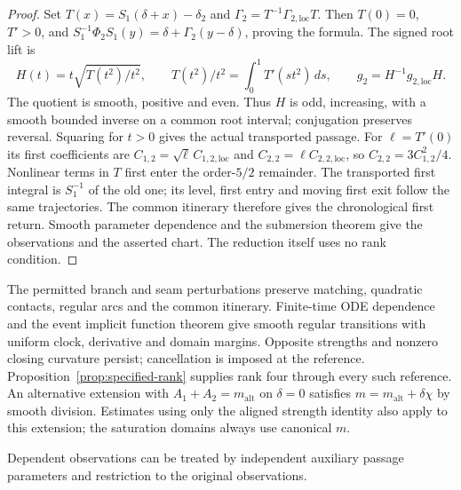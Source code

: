 \begin{proof}
Set $T(x)=S_1(\delta+x)-\delta_2$ and
$\Gamma_2=T^{-1}\Gamma_{2,\mathrm{loc}}T$.
Then $T(0)=0$, $T'>0$, and
$S_1^{-1}\Phi_2S_1(y)=\delta+\Gamma_2(y-\delta)$, proving the formula.
The signed root lift is
\[
 H(t)=t\sqrt{T(t^2)/t^2},\qquad
 T(t^2)/t^2=\int_0^1T'(st^2)\,ds,\qquad
 g_2=H^{-1}g_{2,\mathrm{loc}}H.
\]
The quotient is smooth, positive and even. Thus $H$ is odd, increasing,
with a smooth bounded inverse on a common root interval; conjugation
preserves reversal. Squaring for $t>0$ gives the actual transported passage.
For $\ell=T'(0)$ its first coefficients are
$C_{1,2}=\sqrt\ell\,C_{1,2,\mathrm{loc}}$ and
$C_{2,2}=\ell C_{2,2,\mathrm{loc}}$, so $C_{2,2}=3C_{1,2}^2/4$.
Nonlinear terms in $T$ first enter the order-$5/2$ remainder.
The transported first integral is $S_1^{-1}$ of the old one; its level,
first entry and moving first exit follow the same trajectories.
The common itinerary therefore gives the chronological first return.
Smooth parameter dependence and the submersion theorem give the observations
and the asserted chart. The reduction itself uses no rank condition.
\end{proof}

The permitted branch and seam perturbations preserve matching, quadratic
contacts, regular arcs and the common itinerary. Finite-time ODE dependence
and the event implicit function theorem give smooth regular transitions
with uniform clock, derivative and domain margins. Opposite strengths and
nonzero closing curvature persist; cancellation is imposed at the reference.
Proposition~\ref{prop:specified-rank} supplies rank four through every such
reference. An alternative extension with $A_1+A_2=m_{\mathrm{alt}}$ on
$\delta=0$ satisfies $m=m_{\mathrm{alt}}+\delta\chi$ by smooth division. Estimates using only
the aligned strength identity also apply to this extension; the saturation
domains always use canonical $m$.

Dependent observations can be treated by independent auxiliary passage
parameters and restriction to the original observations.

